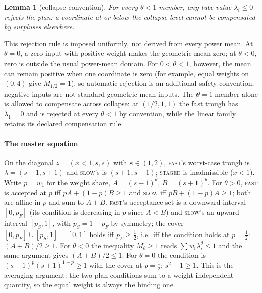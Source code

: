 \documentclass[preprint,11pt,authoryear]{elsarticle}
\newtheorem{lemma}{Lemma}
\theoremstyle{remark}
\newcommand{\act}[1]{\textsc{#1}}
\begin{document}
\begin{lemma}[collapse convention]\label{lem:collapse}
For every $\theta<1$ member, any tube value $\lambda_i\le0$ rejects the plan: a coordinate at or below the collapse level cannot be compensated by surpluses elsewhere.
\end{lemma}
\noindent This rejection rule is imposed uniformly, not derived from every power mean. At $\theta=0$, a zero input with positive weight makes the geometric mean zero; at $\theta<0$, zero is outside the usual power-mean domain. For $0<\theta<1$, however, the mean can remain positive when one coordinate is zero (for example, equal weights on $(0,4)$ give $M_{1/2}=1$), so automatic rejection is an additional safety convention; negative inputs are not standard geometric-mean inputs. The $\theta=1$ member alone is allowed to compensate across collapse: at $(1/2,1,1)$ the fast trough has $\lambda_1=0$ and is rejected at every $\theta<1$ by convention, while the linear family retains its declared compensation rule.

\paragraph{The master equation} On the diagonal $z=(x<1,s,s)$ with $s\in(1,2)$, \act{fast}'s worst-case trough is $\lambda=(s-1,s+1)$ and \act{slow}'s is $(s+1,s-1)$; \act{staged} is inadmissible ($x<1$). Write $p=w_1$ for the weight share, $A=(s-1)^\theta$, $B=(s+1)^\theta$. For $\theta>0$, \act{fast} is accepted at $p$ iff $pA+(1-p)B\ge1$ and \act{slow} iff $pB+(1-p)A\ge1$; both are affine in $p$ and sum to $A+B$. \act{fast}'s acceptance set is a downward interval $[0,p_F]$ (its condition is decreasing in $p$ since $A<B$) and \act{slow}'s an upward interval $[p_S,1]$, with $p_S=1-p_F$ by symmetry; the cover $[0,p_F]\cup[p_S,1]=[0,1]$ holds iff $p_F\ge\tfrac12$, i.e.\ iff the condition holds at $p=\tfrac12$: $(A+B)/2\ge1$. For $\theta<0$ the inequality $M_\theta\ge1$ reads $\sum w_i\lambda_i^\theta\le1$ and the same argument gives $(A+B)/2\le1$. For $\theta=0$ the condition is $(s-1)^p(s+1)^{1-p}\ge1$ with the cover at $p=\tfrac12$: $s^2-1\ge1$. This is the averaging argument: the two plan conditions sum to a weight-independent quantity, so the equal weight is always the binding one.
\end{document}
